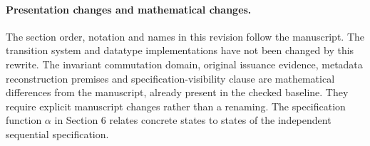 \paragraph{Presentation changes and mathematical changes.}
The section order, notation and names in this revision follow the manuscript.
The transition system and datatype implementations have not been changed by
this rewrite. The invariant commutation domain, original issuance evidence,
metadata reconstruction premises and specification-visibility clause are
mathematical differences from the manuscript, already present in the checked
baseline. They require explicit manuscript changes rather than a renaming.
The specification function $\alpha$ in Section 6 relates concrete states to
states of the independent sequential specification.
